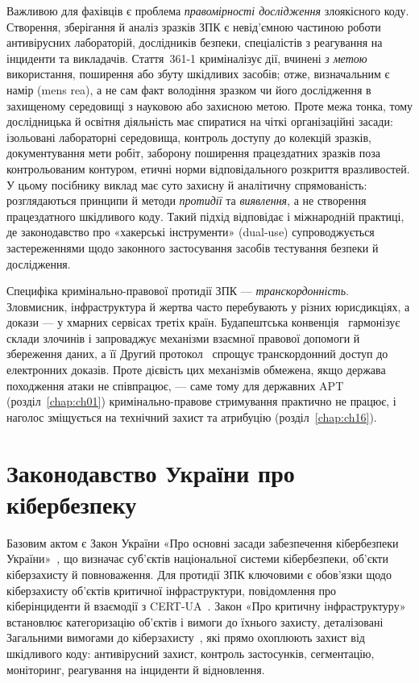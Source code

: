 Важливою для фахівців є проблема \emph{правомірності дослідження} злоякісного коду. Створення, зберігання й аналіз зразків ЗПК є невід'ємною частиною роботи антивірусних лабораторій, дослідників безпеки, спеціалістів з реагування на інциденти та викладачів. Стаття~361-1 криміналізує дії, вчинені \emph{з метою} використання, поширення або збуту шкідливих засобів; отже, визначальним є намір (mens rea), а не сам факт володіння зразком чи його дослідження в захищеному середовищі з науковою або захисною метою. Проте межа тонка, тому дослідницька й освітня діяльність має спиратися на чіткі організаційні засади: ізольовані лабораторні середовища, контроль доступу до колекцій зразків, документування мети робіт, заборону поширення працездатних зразків поза контрольованим контуром, етичні норми відповідального розкриття вразливостей. У цьому посібнику виклад має суто захисну й аналітичну спрямованість: розглядаються принципи й методи \emph{протидії} та \emph{виявлення}, а не створення працездатного шкідливого коду. Такий підхід відповідає і міжнародній практиці, де законодавство про «хакерські інструменти» (dual-use) супроводжується застереженнями щодо законного застосування засобів тестування безпеки й дослідження.

Специфіка кримінально-правової протидії ЗПК --- \emph{транскордонність}. Зловмисник, інфраструктура й жертва часто перебувають у різних юрисдикціях, а докази --- у хмарних сервісах третіх країн. Будапештська конвенція~\cite{budapest} гармонізує склади злочинів і запроваджує механізми взаємної правової допомоги й збереження даних, а її Другий протокол~\cite{ch02:budapest-ap} спрощує транскордонний доступ до електронних доказів. Проте дієвість цих механізмів обмежена, якщо держава походження атаки не співпрацює, --- саме тому для державних APT (розділ~\ref{chap:ch01}) кримінально-правове стримування практично не працює, і наголос зміщується на технічний захист та атрибуцію (розділ~\ref{chap:ch16}).

\section{Законодавство України про кібербезпеку}\label{sec:ch02-ukraine}

Базовим актом є Закон України «Про основні засади забезпечення кібербезпеки України»~\cite{zu-cyber}, що визначає суб'єктів національної системи кібербезпеки, об'єкти кіберзахисту й повноваження. Для протидії ЗПК ключовими є обов'язки щодо кіберзахисту об'єктів критичної інфраструктури, повідомлення про кіберінциденти й взаємодії з CERT-UA~\cite{cert-ua}. Закон «Про критичну інфраструктуру»~\cite{zu-ki} встановлює категоризацію об'єктів і вимоги до їхнього захисту, деталізовані Загальними вимогами до кіберзахисту~\cite{kmu-518,cip}, які прямо охоплюють захист від шкідливого коду: антивірусний захист, контроль застосунків, сегментацію, моніторинг, реагування на інциденти й відновлення.

